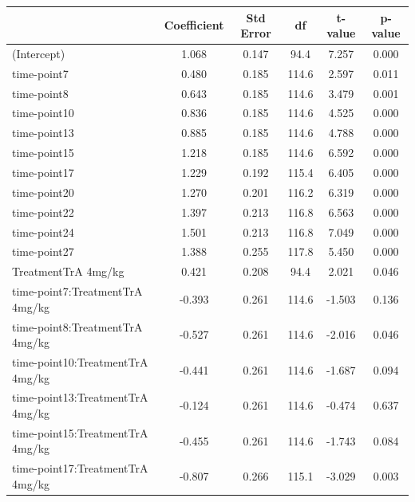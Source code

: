 \newpage
\begin{table}
	\centering
	\small
	\begin{tabular}{lccccc}
		\hline
		                                & Coefficient & Std Error & df    & t-value & p-value \\
		\hline
		(Intercept)                     & 1.068       & 0.147     & 94.4  & 7.257   & 0.000   \\
		time-point7                      & 0.480       & 0.185     & 114.6 & 2.597   & 0.011   \\
		time-point8                      & 0.643       & 0.185     & 114.6 & 3.479   & 0.001   \\
		time-point10                     & 0.836       & 0.185     & 114.6 & 4.525   & 0.000   \\
		time-point13                     & 0.885       & 0.185     & 114.6 & 4.788   & 0.000   \\
		time-point15                     & 1.218       & 0.185     & 114.6 & 6.592   & 0.000   \\
		time-point17                     & 1.229       & 0.192     & 115.4 & 6.405   & 0.000   \\
		time-point20                     & 1.270       & 0.201     & 116.2 & 6.319   & 0.000   \\
		time-point22                     & 1.397       & 0.213     & 116.8 & 6.563   & 0.000   \\
		time-point24                     & 1.501       & 0.213     & 116.8 & 7.049   & 0.000   \\
		time-point27                     & 1.388       & 0.255     & 117.8 & 5.450   & 0.000   \\
		TreatmentTrA 4mg/kg             & 0.421       & 0.208     & 94.4  & 2.021   & 0.046   \\
		time-point7:TreatmentTrA 4mg/kg  & -0.393      & 0.261     & 114.6 & -1.503  & 0.136   \\
		time-point8:TreatmentTrA 4mg/kg  & -0.527      & 0.261     & 114.6 & -2.016  & 0.046   \\
		time-point10:TreatmentTrA 4mg/kg & -0.441      & 0.261     & 114.6 & -1.687  & 0.094   \\
		time-point13:TreatmentTrA 4mg/kg & -0.124      & 0.261     & 114.6 & -0.474  & 0.637   \\
		time-point15:TreatmentTrA 4mg/kg & -0.455      & 0.261     & 114.6 & -1.743  & 0.084   \\
		time-point17:TreatmentTrA 4mg/kg & -0.807      & 0.266     & 115.1 & -3.029  & 0.003   \\

\end{tabular}
\end{table}
